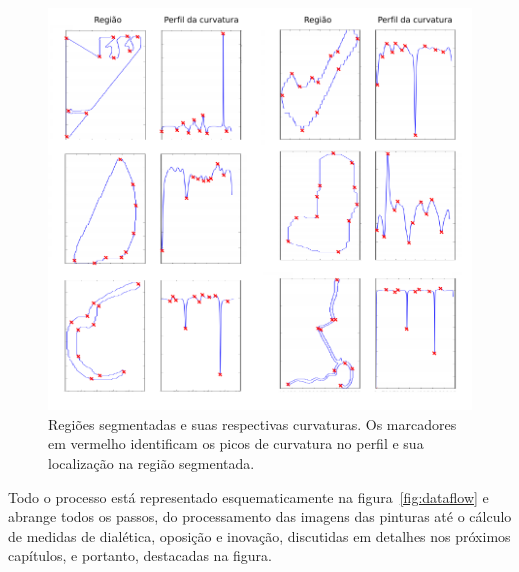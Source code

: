 \begin{figure}[ht!]
\begin{center}
            \caption{Regiões segmentadas e suas respectivas curvaturas. Os
        marcadores em vermelho identificam os picos de curvatura no
        perfil e sua localização na região segmentada.}
        \label{fig:passos_curvatura}
        \includegraphics[scale=1]{figs/passos_curvatura}
        \fonteminha
\end{center}
\end{figure}

Todo o processo está representado esquematicamente na figura~\ref{fig:dataflow}
e abrange todos os passos, do processamento das imagens das pinturas até o
cálculo de medidas de dialética, oposição e inovação, discutidas em detalhes nos
próximos capítulos, e portanto, destacadas na figura.


